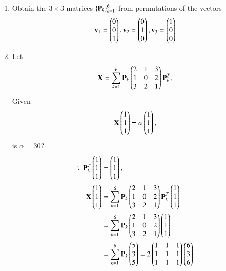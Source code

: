 \renewcommand{\theequation}{\theenumi}
\begin{enumerate}[label=\arabic*.,ref=\thesubsection.\theenumi]
\item Obtain the  $3 \times 3$ matrices $\left\{\mathbf{P}_k\right\}_{k=1}^{6}$ from permutations of the  vectors
\begin{align}
\mathbf{v}_1 = \begin{pmatrix}0 \\ 0 \\ 1\end{pmatrix},
\mathbf{v}_2 = \begin{pmatrix}0 \\ 1 \\ 0\end{pmatrix},
\mathbf{v}_3 = \begin{pmatrix}1 \\ 0 \\ 0\end{pmatrix}
\end{align}
%
%
\item Let 
\begin{align}
\mathbf{X} = \sum_{k=1}^{6}\mathbf{P}_k\begin{pmatrix}2 & 1 & 3 \\ 1 & 0 & 2 \\ 3 & 2 & 1\end{pmatrix}\mathbf{P}_k^T.
\end{align}
Given 
\begin{align}
\mathbf{X}\begin{pmatrix}1 \\1 \\1\end{pmatrix} = \alpha\begin{pmatrix}1 \\1 \\1\end{pmatrix},
\label{eq:2019_qp2_1_alpha}
\end{align}
is
$\alpha= 30$?
\\
\solution 
\begin{align}
\because \vec{P}_k^T\myvec{1 \\1 \\1} &=  \myvec{1 \\1 \\1},
\nonumber \\
\vec{X}\myvec{1 \\1 \\1} &= \sum_{k=1}^{6}\vec{P}_k\myvec{2 & 1 & 3 \\ 1 & 0 & 2 \\ 3 & 2 & 1}\vec{P}_k^T\myvec{1 \\1 \\1} 
\nonumber \\
&= \sum_{k=1}^{6}\vec{P}_k\myvec{2 & 1 & 3 \\ 1 & 0 & 2 \\ 3 & 2 & 1}\myvec{1 \\1 \\1} 
\nonumber \\
&= \sum_{k=1}^{6}\vec{P}_k\myvec{5 \\3 \\5} =2\myvec{1 & 1 & 1 \\ 1 & 1 & 1 \\ 1 & 1 & 1}\myvec{6 \\3 \\6}

\end{align}
\end{enumerate}
